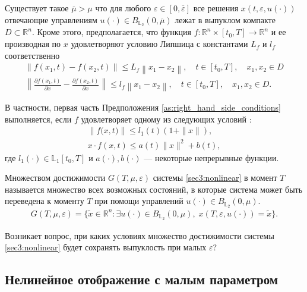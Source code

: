 \documentclass[../main.tex]{subfiles}
\begin{document}
\begin{assumption}\label{as:right_hand_side_conditions}
	
	Существует такое $\overline{\mu} > \mu $ что для любого $\varepsilon \in [0, \overline{\varepsilon}] $ все решения $ x(t,\varepsilon, u(\cdot)) $ отвечающие управлениям $u(\cdot) \in B_{\mathbb{L}_2}(0,\overline{\mu})$  лежат в выпуклом компакте $D \subset \mathbb{R}^n$.
	Кроме этого, предполагается, что функция $f: \mathbb{R}^n \times [t_0,T] \to \mathbb{R}^n$ и ее производная по $x$ удовлетворяют условию Липшица с константами $L_f$ и $l_f$ соответственно
	\begin{gather*}
		\left\| f(x_1,t) - f(x_2,t) \right\| \leqslant L_f \left\| x_1 - x_2 \right\|, \quad t\in[t_0,T], \quad x_1, x_2 \in D\\
		\left\| \frac{\partial f(x_1,t)}{\partial x} - \frac{\partial f(x_2,t)}{\partial x} \right\| \leqslant l_f \left\| x_1 - x_2 \right\|, \quad t\in[t_0,T], \quad x_1, x_2 \in D.
	\end{gather*}
\end{assumption} 

В частности, первая часть Предположения \ref{as:right_hand_side_conditions} выполняется, если  $f$ удовлетворяет одному из следующих условий \cite{Fillipov2}:
\begin{gather}\label{sublinear_growth}
	\left\|f\big(x,t\big) \right\| \leqslant l_1(t) (1 + \|x\|), \\ 
	x \cdot f(x,t) \leqslant a(t) \|x\|^2 + b(t),
\end{gather}
где $l_1(\cdot) \in \mathbb{L}_1[t_0,T]$ и $a(\cdot), b(\cdot)$ --- некоторые непрерывные функции.

\begin{definition} 
	Множеством достижимости $G(T,\mu,\varepsilon) $ системы \eqref{sec3:nonlinear} в момент $T$ называется множество всех возможных состояний, в которые система может быть переведена  к моменту $T$ при помощи управлений  $ u(\cdot) \in B_{\mathbb{L}_2}(0,\mu) $.
	\begin{gather*}
		G(T,\mu,\varepsilon) =\{\widetilde{x}\in \mathbb{R}^n:\exists u(\cdot)\in B_{\mathbb{L}_2}(0,\mu),\; x(T,\varepsilon,u(\cdot)) = \widetilde{x}\}.
	\end{gather*}
\end{definition} 
Возникает вопрос, при каких условиях множество достижимости системы \eqref{sec3:nonlinear} будет сохранять выпуклость при малых $\varepsilon$?

\subsection{Нелинейное отображение с малым параметром}
\end{document}
